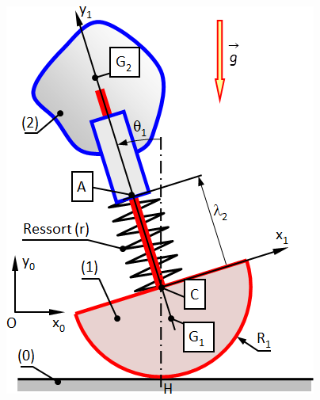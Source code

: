 \documentclass[10pt,fleqn]{article} %
\begin{document}
\begin{multicols}{2}
\begin{center}
\includegraphics[width=\linewidth]{images/fig_01}
\end{center}

\ifprof
\else
\end{multicols}
\fi

%


\end{document}
